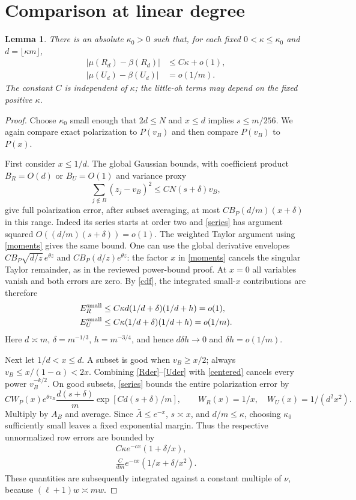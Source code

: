 \documentclass[11pt]{article}
\newtheorem{lemma}{Lemma}
\begin{document}
\section*{Comparison at linear degree}
\begin{lemma}\label{comparison}
There is an absolute $\kappa_0>0$ such that, for each fixed
$0<\kappa\le\kappa_0$ and $d=\lfloor\kappa m\rfloor$,
\begin{align}
 |\mu(R_d)-\beta(R_d)|&\le C\kappa+o(1),\label{Rcompare}\\
 |\mu(U_d)-\beta(U_d)|&=o(1/m).\label{Ucompare}
\end{align}
The constant $C$ is independent of $\kappa$; the little-oh terms may
depend on the fixed positive $\kappa$.
\end{lemma}
\begin{proof}
Choose $\kappa_0$ small enough that $2d\le N$ and $x\le d$ implies
$s\le m/256$. We again compare exact polarization to $P(v_B)$ and
then compare $P(v_B)$ to $P(x)$.

First consider $x\le1/d$. The global Gaussian bounds, with coefficient
product $B_R=O(d)$ or $B_U=O(1)$ and variance proxy
\[
 \sum_{j\notin B}(z_j-v_B)^2\le C N(s+\delta)v_B,
\]
give full polarization error, after subset averaging, at most
$C B_P(d/m)(x+\delta)$ in this range. Indeed its series starts at
order two and \eqref{series} has argument squared
$O((d/m)(s+\delta))=o(1)$. The weighted Taylor argument using
\eqref{moments} gives the same bound. One can use the global derivative
envelopes $C B_P\sqrt{d/z}\,e^{\theta z}$ and
$C B_P(d/z)e^{\theta z}$: the factor $x$ in \eqref{moments} cancels
the singular Taylor remainder, as in the reviewed power-bound proof.
At $x=0$ all variables vanish and both errors are zero.
By \eqref{cdf}, the integrated small-$x$ contributions are therefore
\begin{align}
 E_R^{\rm small}&\le C\kappa d(1/d+\delta)(1/d+h)=o(1),\label{smallR}\\
 E_U^{\rm small}&\le C\kappa(1/d+\delta)(1/d+h)=o(1/m).\label{smallU}
\end{align}
Here $d\asymp m$, $\delta=m^{-1/3}$, $h=m^{-3/4}$, and hence
$d\delta h\to0$ and $\delta h=o(1/m)$.

Next let $1/d<x\le d$. A subset is good when $v_B\ge x/2$;
always $v_B\le x/(1-\alpha)<2x$. Combining \eqref{Rder}--\eqref{Uder}
with \eqref{centered} cancels every power $v_B^{-k/2}$.
On good subsets, \eqref{series} bounds the entire polarization error
by
\[
 C W_P(x)e^{\theta v_B}\frac{d(s+\delta)}m
                           \exp[Cd(s+\delta)/m],
 \qquad W_R(x)=1/x,\quad W_U(x)=1/(d^2x^2).
\]
Multiply by $A_B$ and average. Since $\bar A\le e^{-x}$,
$s\asymp x$, and $d/m\le\kappa$, choosing $\kappa_0$ sufficiently
small leaves a fixed exponential margin. Thus the respective
unnormalized row errors are bounded by
\begin{align}
 C\kappa e^{-cx}(1+\delta/x),\label{Renvelope}\\
 \frac{C}{dm}e^{-cx}(1/x+\delta/x^2).\label{Uenvelope}
\end{align}
These quantities are subsequently integrated against a constant
multiple of $\nu$, because $(\ell+1)w\asymp mw$.


\end{proof}
\end{document}
